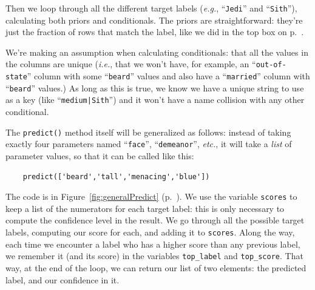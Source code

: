 Then we loop through all the different target labels (\textit{e.g.},
``\texttt{Jedi}'' and ``\texttt{Sith}''), calculating both priors and
conditionals. The priors are straightforward: they're just the fraction of rows
that match the label, like we did in the top box on p.~\pageref{calcPriors}.

We're making an assumption when calculating conditionals: that all the values
in the columns are unique (\textit{i.e.}, that we won't have, for example, an
``\texttt{out-of-state}'' column with some ``\texttt{beard}'' values and also
have a ``\texttt{married}'' column with ``\texttt{beard}'' values.) As long as
this is true, we know we have a unique string to use as a key (like
``\texttt{medium|Sith}'') and it won't have a name collision with any other
conditional.

The \texttt{predict()} method itself will be generalized as follows: instead
of taking exactly four parameters named ``\texttt{face}'',
``\texttt{demeanor}'', \textit{etc.}, it will take a \textit{list} of
parameter values, so that it can be called like this:

\vspace{-.1in}
\begin{verbatim}
    predict(['beard','tall','menacing','blue'])
\end{verbatim}
\vspace{-.1in}

The code is in Figure~\ref{fig:generalPredict}
(p.~\pageref{fig:generalPredict}). \label{codingNbGenerallyPredict} We use the
variable \texttt{scores} to keep a list of the numerators for each target
label: this is only necessary to compute the confidence level in the result. We
go through all the possible target labels, computing our score for each, and
adding it to \texttt{scores}. Along the way, each time we encounter a label who
has a higher score than any previous label, we remember it (and its score) in
the variables \texttt{top\_label} and \texttt{top\_score}. That way, at the end
of the loop, we can return our list of two elements: the predicted label, and
our confidence in it.

